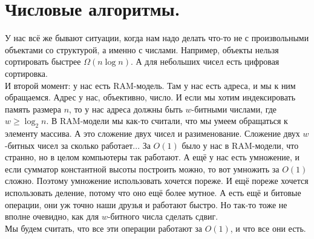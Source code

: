 \documentclass{article}
\begin{document}
    \section{Числовые алгоритмы.}
    У нас всё же бывают ситуации, когда нам надо делать что-то не с произвольными объектами со структурой, а именно с числами. Например, объекты нельзя сортировать быстрее $\Omega(n\log n)$. А для небольших чисел есть цифровая сортировка.\\
    И второй момент: у нас есть RAM-модель. Там у нас есть адреса, и мы к ним обращаемся. Адрес у нас, объективно, число. И если мы хотим индексировать память размера $n$, то у нас адреса должны быть $w$-битными числами, где $w\geqslant \log_2n$. В RAM-модели мы как-то считали, что мы умеем обращаться к элементу массива. А это сложение двух чисел и разименование. Сложение двух $w$-битных чисел за сколько работает... За $O(1)$ было у нас в RAM-модели, что странно, но в целом компьютеры так работают. А ещё у нас есть умножение, и если сумматор константной высоты построить можно, то вот умножить за $O(1)$ сложно. Поэтому умножение использовать хочется пореже. И ещё пореже хочется использовать деление, потому что оно ещё более мутное. А есть ещё и битовые операции, они уж точно наши друзья и работают быстро. Но так-то тоже не вполне очевидно, как для $w$-битного числа сделать сдвиг.\\
    Мы будем считать, что все эти операции работают за $O(1)$, и что все они есть.\\
\end{document}
